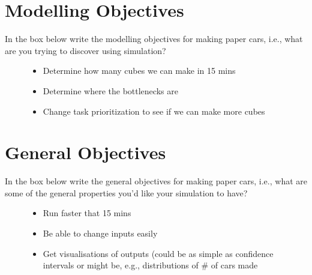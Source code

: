 \documentclass[
  10pt,
  a4paperpaper,
  DIV=11,
  numbers=noendperiod,
  oneside]{scrreprt}
\providecommand{\tightlist}{%
  \setlength{\itemsep}{0pt}\setlength{\parskip}{0pt}}\usepackage{longtable,booktabs,array}
\begin{document}
\section{Modelling Objectives}\label{modelling-objectives}

In the box below write the modelling objectives for making paper cars,
i.e., what are you trying to discover using simulation?

\begin{figure}

\begin{mdframed}[innerbottommargin=3cm]

\begin{itemize}
\tightlist
\item
  Determine how many cubes we can make in 15 mins
\item
  Determine where the bottlenecks are
\item
  Change task prioritization to see if we can make more cubes
\end{itemize}

\end{mdframed}

\end{figure}%

\newpage{}

\section{General Objectives}\label{general-objectives}

In the box below write the general objectives for making paper cars,
i.e., what are some of the general properties you'd like your simulation
to have?

\begin{figure}

\begin{mdframed}[innerbottommargin=4.5cm]

\begin{itemize}
\tightlist
\item
  Run faster that 15 mins
\item
  Be able to change inputs easily
\item
  Get visualisations of outputs (could be as simple as confidence
  intervals or might be, e.g., distributions of \# of cars made
\end{itemize}

\end{mdframed}

\end{figure}%
\end{document}
